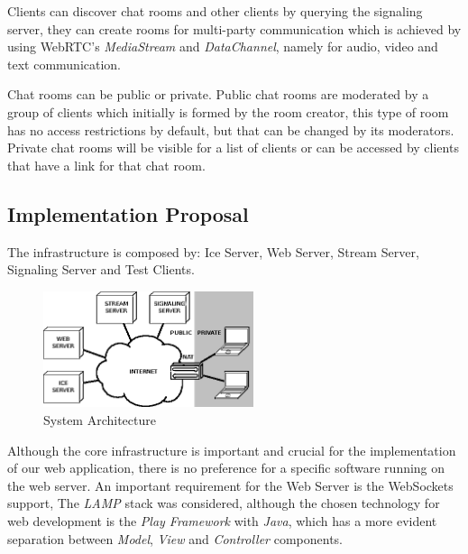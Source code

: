 Clients can discover chat rooms and other clients by querying the signaling server, they can create rooms for multi-party communication which is achieved by using \ac{WebRTC}'s \emph{MediaStream} and \emph{DataChannel}, namely for audio, video and text communication.

Chat rooms can be public or private. Public chat rooms are moderated by a group of clients which initially is formed by the room creator, this type of room has no access restrictions by default, but that can be changed by its moderators. Private chat rooms will be visible for a list of clients or can be accessed by clients that have a link for that chat room.


 
\subsection{Implementation Proposal}
The infrastructure is composed by: Ice Server, Web Server, Stream Server, Signaling Server and Test Clients.

\begin{figure}[H]
	\centering
	\includegraphics[width=0.55\textwidth]{figures/arch.png}
	\caption{System Architecture}
\end{figure}

Although the core infrastructure is important and crucial for the implementation of our web application, there is no preference for a specific software running on the web server. An important requirement for the Web Server is the WebSockets support, The \emph{LAMP} stack was considered, although the chosen technology for web development is the \emph{Play Framework} with \emph{Java}, which has a more evident separation between \emph{Model}, \emph{View} and \emph{Controller} components.

